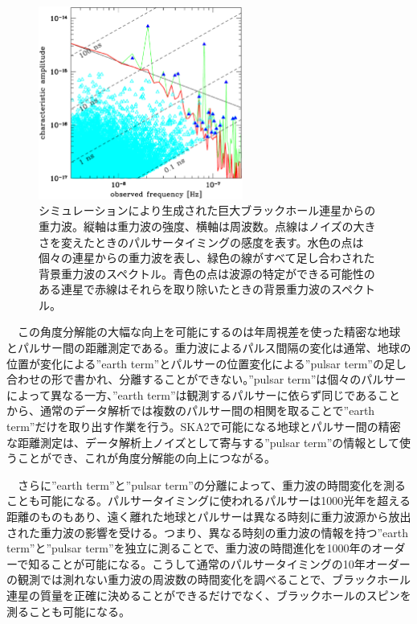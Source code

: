 \begin{figure}[t]
\centering
\includegraphics[width=0.6\textwidth]{pulsar/FIG_GW_SMBH.eps}
\caption{シミュレーションにより生成された巨大ブラックホール連星からの重力波\cite{Sesana2013}。縦軸は重力波の強度、横軸は周波数。点線はノイズの大きさを変えたときのパルサータイミングの感度を表す。水色の点は個々の連星からの重力波を表し、緑色の線がすべて足し合わされた背景重力波のスペクトル。青色の点は波源の特定ができる可能性のある連星で赤線はそれらを取り除いたときの背景重力波のスペクトル。}
\end{figure}

　この角度分解能の大幅な向上を可能にするのは年周視差を使った精密な地球とパルサー間の距離測定である。重力波によるパルス間隔の変化は通常、地球の位置が変化による”earth term”とパルサーの位置変化による”pulsar term”の足し合わせの形で書かれ、分離することができない。”pulsar term”は個々のパルサーによって異なる一方、”earth term”は観測するパルサーに依らず同じであることから、通常のデータ解析では複数のパルサー間の相関を取ることで”earth term”だけを取り出す作業を行う。SKA2で可能になる地球とパルサー間の精密な距離測定は、データ解析上ノイズとして寄与する”pulsar term”の情報として使うことができ、これが角度分解能の向上につながる。

　さらに”earth term”と”pulsar term”の分離によって、重力波の時間変化を測ることも可能になる。パルサータイミングに使われるパルサーは1000光年を超える距離のものもあり、遠く離れた地球とパルサーは異なる時刻に重力波源から放出された重力波の影響を受ける。つまり、異なる時刻の重力波の情報を持つ”earth term”と”pulsar term”を独立に測ることで、重力波の時間進化を1000年のオーダーで知ることが可能になる。こうして通常のパルサータイミングの10年オーダーの観測では測れない重力波の周波数の時間変化を調べることで、ブラックホール連星の質量を正確に決めることができるだけでなく、ブラックホールのスピンを測ることも可能になる。

